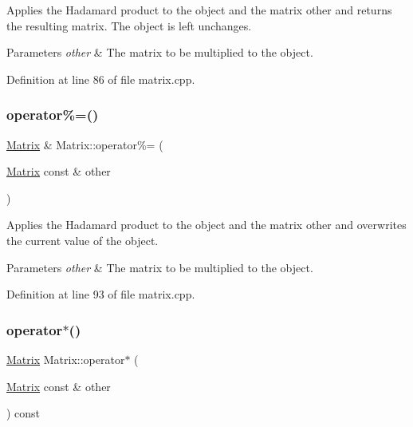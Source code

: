 Applies the Hadamard product to the object and the matrix {\ttfamily other} and returns the resulting matrix. The object is left unchanges.


\begin{DoxyParams}{Parameters}
{\em other} & The matrix to be multiplied to the object. \\
\hline
\end{DoxyParams}


Definition at line 86 of file matrix.\+cpp.

\mbox{\label{classMatrix_ac391b0910e9f0fc0a6e23c9346cee2ad}} 
\subsubsection{\texorpdfstring{operator\%=()}{operator\%=()}}
{\footnotesize\ttfamily \hyperlink{classMatrix}{Matrix} \& Matrix\+::operator\%= (\begin{DoxyParamCaption}\item[{\hyperlink{classMatrix}{Matrix} const \&}]{other }\end{DoxyParamCaption})}

Applies the Hadamard product to the object and the matrix {\ttfamily other} and overwrites the current value of the object.


\begin{DoxyParams}{Parameters}
{\em other} & The matrix to be multiplied to the object. \\
\hline
\end{DoxyParams}


Definition at line 93 of file matrix.\+cpp.

\mbox{\label{classMatrix_a087f5fbe295229d2790871bb14b6a2a5}} 
\subsubsection{\texorpdfstring{operator$\ast$()}{operator*()}\hspace{0.1cm}{\footnotesize\ttfamily [1/2]}}
{\footnotesize\ttfamily \hyperlink{classMatrix}{Matrix} Matrix\+::operator$\ast$ (\begin{DoxyParamCaption}\item[{\hyperlink{classMatrix}{Matrix} const \&}]{other }\end{DoxyParamCaption}) const}

